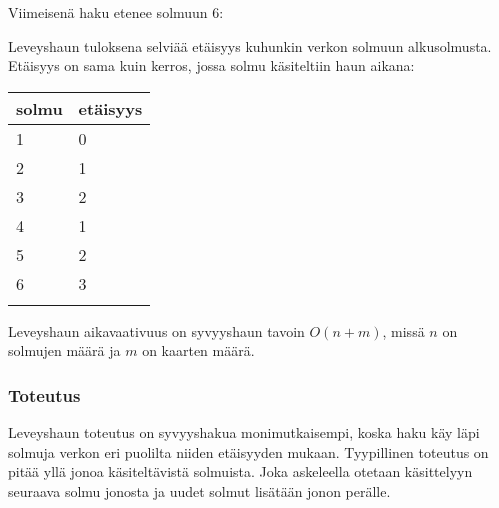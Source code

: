 Viimeisenä haku etenee solmuun 6:
\\
\begin{center}
\end{center}
Leveyshaun tuloksena selviää etäisyys
kuhunkin verkon solmuun alkusolmusta.
Etäisyys on sama kuin kerros,
jossa solmu käsiteltiin haun aikana:

\begin{tabular}{ll}
\\
solmu & etäisyys \\
\hline
1 & 0 \\
2 & 1 \\
3 & 2 \\
4 & 1 \\
5 & 2 \\
6 & 3 \\
\\
\end{tabular}

Leveyshaun aikavaativuus on syvyyshaun tavoin $O(n+m)$,
missä $n$ on solmujen määrä ja $m$ on kaarten määrä.

\subsubsection*{Toteutus}

Leveyshaun toteutus on syvyyshakua monimutkaisempi,
koska haku käy läpi solmuja verkon eri
puolilta niiden etäisyyden mukaan.
Tyypillinen toteutus on pitää yllä jonoa
käsiteltävistä solmuista.
Joka askeleella otetaan käsittelyyn seuraava
solmu jonosta ja uudet solmut lisätään
jonon perälle.

